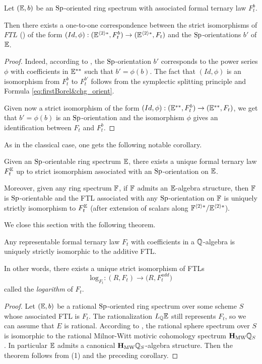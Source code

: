 \begin{prop}\label{prop:sp-orient&FTL}
Let $(\mathbb E,b)$ be an $\mathrm{Sp}$-oriented ring spectrum with associated formal ternary law $F_t^b$.

Then there exists a one-to-one correspondence between the strict isomorphisms of $FTL$ ()
 of the form $(Id,\phi):(\mathbb E^{\langle 2 \rangle*},F_t^b) \rightarrow (\mathbb E^{\langle 2 \rangle*},F_t)$
 and the $\mathrm{Sp}$-orientations $b'$ of $\mathbb E$.
\end{prop}
\begin{proof}
Indeed, according to ,
 the $\mathrm{Sp}$-orientation $b'$ corresponds to the power series $\phi$
 with coefficients in $\mathbb E^{**}$ such that $b'=\phi(b)$.
 The fact that $(Id,\phi)$ is an isomorphism from $F_t^b$ to $F_t^{b'}$
 follows from the symplectic splitting principle and Formula
 \eqref{eq:firstBorel&chg_orient}.

Given now a strict isomorphism of the form
 $(Id,\phi):(\mathbb E^{**},F_t^b) \rightarrow (\mathbb E^{**},F_t)$,
 we get that $b'=\phi(b)$ is an $\mathrm{Sp}$-orientation and the isomorphism $\phi$
 gives an identification between $F_t$ and $F_t^b$.
\end{proof}

As in the classical case, one gets the following notable corollary.
\begin{cor}
Given an $\mathrm{Sp}$-orientable ring spectrum $\mathbb E$,
 there exists a unique formal ternary law $F_t^\mathbb E$ up to strict isomorphism associated with an $\mathrm{Sp}$-orientation on $\mathbb E$.

Moreover, given any ring spectrum $\mathbb F$, if $\mathbb F$ admits an $\mathbb E$-algebra structure,
 then $\mathbb F$ is $\mathrm{Sp}$-orientable and the FTL associated with any $\mathrm{Sp}$-orientation on $\mathbb F$
 is uniquely strictly isomorphism to $F_t^\mathbb E$
 (after extension of scalars along $\mathbb F^{\langle 2 \rangle*}/\mathbb E^{\langle 2 \rangle*}$).
\end{cor}

We close this section with the following theorem.
\begin{thm}\label{thm:log_FTL}
 Any representable formal ternary law $F_t$
 with coefficients in a $\mathbb{Q}$-algebra is uniquely strictly isomorphic to the additive FTL.
\end{thm}
In other words, there exists a unique strict isomorphism of FTLs
$$
\mathrm{log}_{F_t}:(R,F_t) \rightarrow \big(R,F_t^{add}\big)
$$
called the \emph{logarithm} of $F_t$.
\begin{proof}
Let $(\mathbb E,b)$ be a rational $\mathrm{Sp}$-oriented ring spectrum over some scheme $S$
 whose associated FTL is $F_t$.
 The rationalization $L_{\mathbb{Q}}\mathbb E$ still represents $F_t$,
 so we can assume that $E$ is rational.
 According to \cite[Cor. 6.2]{DFJK}, the rational sphere spectrum over $S$ is isomorphic
 to the rational Milnor-Witt motivic cohomology spectrum $\mathbf{H}_\mathrm{MW}\mathbb{Q}_S$.
 In particular $\mathbb E$ admits a canonical $\mathbf{H}_\mathrm{MW}\mathbb{Q}_S$-algebra structure.
 Then the theorem follows from (1) and the preceding corollary.
\end{proof}

